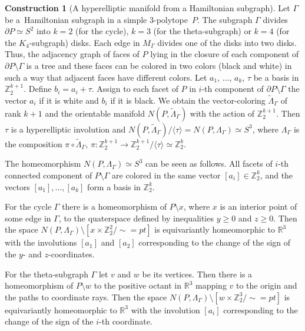 \documentclass[12pt]{amsart}
\theoremstyle{definition}
\newtheorem{construction}[formula]{Construction}
\theoremstyle{remark}
\begin{document}
\begin{construction}[A hyperelliptic manifold from a Hamiltonian subgraph]\label{HCC}
Let $\Gamma$ be a~Hamiltonian subgraph in a 
simple $3$-polytope~$P$.  The subgraph $\Gamma$ divides $\partial P\simeq S^2$ into $k=2$ (for the cycle), 
$k=3$ (for the theta-subgraph) or $k=4$ (for the $K_4$-subgraph) disks.  Each edge in $M_\Gamma$ divides one of the disks
into two disks. Thus, the adjacency graph of faces of $P$ lying in the closure of 
each component of $\partial P\setminus\Gamma$  is a tree and these faces can be colored in two colors (black and white) 
in such a way that adjacent faces have different colors. 
Let $a_1$, $\dots$, $a_k$, $\tau$ be a basis in $\mathbb Z_2^{k+1}$. Define $b_i=a_i+\tau$. 
Assign to each facet of $P$ in $i$-th component of $\partial P\setminus\Gamma$ the vector $a_i$ if it is white and $b_i$
if it is black. We obtain the vector-coloring $\widetilde{\Lambda}_{\Gamma}$ of rank $k+1$
and the orientable manifold $N(P,\widetilde{\Lambda}_{\Gamma})$ with the action of $\mathbb Z_2^{k+1}$. 
Then $\tau$ is a hyperelliptic involution and 
$N(P,\widetilde{\Lambda}_{\Gamma})/\langle\tau\rangle=N(P,\Lambda_{\Gamma})\simeq S^3$,
where $\Lambda_\Gamma$ is the composition $\pi\circ\widetilde{\Lambda}_{\Gamma}$, 
$\pi\colon \mathbb Z_2^{k+1}\to \mathbb Z_2^{k+1}/\langle\tau\rangle\simeq \mathbb Z_2^k$.
\end{construction}


The homeomorphism $N(P,\Lambda_{\Gamma})\simeq S^3$ can be seen as follows. 
All facets of $i$-th connected component of $P\setminus\Gamma$ are colored in the same vector $[a_i]\in \mathbb Z_2^k$,
and the vectors $[a_1],\dots,[a_k]$ form a basis in $\mathbb Z_2^k$. 

For the cycle $\Gamma$ there is a homeomorphism of $P\setminus x$, where $x$ is an interior point of some edge in $\Gamma$,
to the quaterspace defined by inequalities $y\geqslant 0$ and $z\geqslant 0$. 
Then the space $N(P,\Lambda_{\Gamma})\setminus [x\times \mathbb Z_2^2/\sim=pt]$ is equivariantly 
homeomorphic to $\mathbb R^3$ with the involutions $[a_1]$ and $[a_2]$ 
corresponding to the change of the sign of the $y$- and $z$-coordinates.

For the theta-subgraph $\Gamma$ let $v$ and $w$ be its vertices. Then there is a homeomorphism of $P\setminus w$
to the positive octant in $\mathbb R^3$ mapping $v$ to the origin and the paths to coordinate rays.  
Then the space $N(P,\Lambda_{\Gamma})\setminus [w\times \mathbb Z_2^3/\sim=pt]$ is equivariantly homeomorphic 
to $\mathbb R^3$ with the involution $[a_i]$ corresponding to the change of the sign of the $i$-th coordinate.
\end{document}
